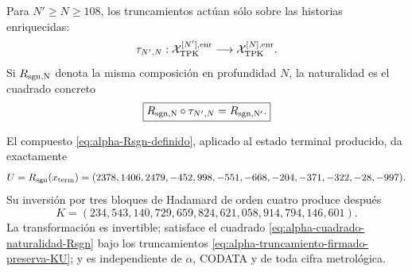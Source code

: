 \begin{definition}
Para \(N'\geq N\geq108\), los truncamientos actúan sólo sobre las historias
enriquecidas:
\begin{equation}\label{eq:alpha-truncamiento-firmado-preserva-KU}
 \tau_{N',N}:
 \mathcal X_{\rm TPK}^{[N'],\rm enr}
 \longrightarrow\mathcal X_{\rm TPK}^{[N],\rm enr}.
\end{equation}
Si \(R_{\rm sgn,N}\) denota la misma composición en profundidad \(N\), la
naturalidad es el cuadrado concreto
\begin{equation}\label{eq:alpha-cuadrado-naturalidad-Rsgn}
 \boxed{
 R_{\rm sgn,N}\circ\tau_{N',N}
 =R_{\rm sgn,N'}.}
\end{equation}
\end{definition}

\begin{theorem}
\label{thm:alpha-Rsgn-construido}
El compuesto \eqref{eq:alpha-Rsgn-definido}, aplicado al estado terminal
producido, da exactamente
\begin{equation}\label{eq:alpha-Rsgn-evaluacion}
 U=R_{\rm sgn}(x_{\rm term})
 =(2378,1406,2479,-452,998,-551,-668,-204,-371,-322,-28,-997).
\end{equation}
Su inversión por tres bloques de Hadamard de orden cuatro produce después
\[
 \boxed{
 K=(234,543,140,729,659,824,621,058,914,794,146,601).}
\]
La transformación es invertible; satisface el cuadrado
\eqref{eq:alpha-cuadrado-naturalidad-Rsgn} bajo los truncamientos
\eqref{eq:alpha-truncamiento-firmado-preserva-KU}; y es independiente de
\(\alpha\), CODATA y de toda cifra metrológica.
\end{theorem}

